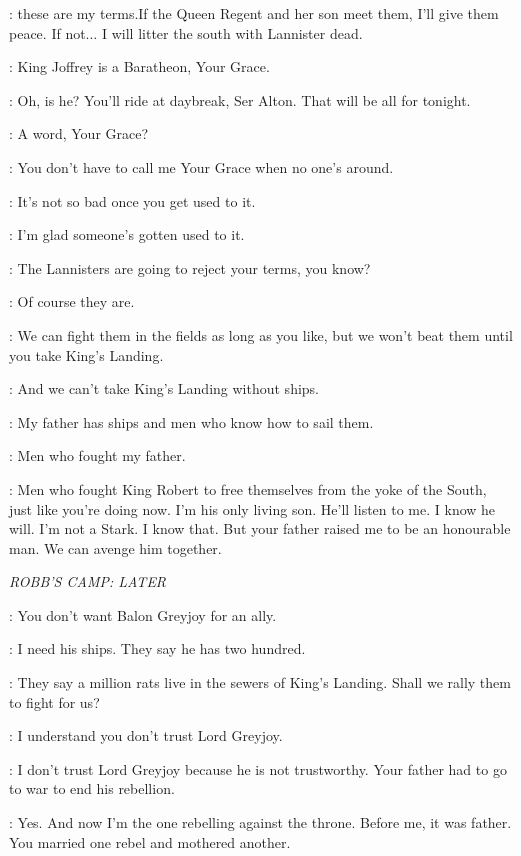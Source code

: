 \ROBB: these are my terms.If the Queen Regent and her son meet them, I'll give them peace. If not$\ldots$ I will litter the south with Lannister dead.

\ALTON: King Joffrey is a Baratheon, Your Grace.

\ROBB: Oh, is he? You'll ride at daybreak, Ser Alton. That will be all for tonight.


\THEON: A word, Your Grace?

\ROBB: You don't have to call me Your Grace when no one's around.

\THEON: It's not so bad once you get used to it.

\ROBB: I'm glad someone's gotten used to it.

\THEON: The Lannisters are going to reject your terms, you know?

\ROBB: Of course they are.

\THEON: We can fight them in the fields as long as you like, but we won't beat them until you take King's Landing.

\ROBB: And we can't take King's Landing without ships.

\THEON: My father has ships and men who know how to sail them.

\ROBB: Men who fought my father.

\THEON: Men who fought King Robert to free themselves from the yoke of the South, just like you're doing now. I'm his only living son. He'll listen to me. I know he will. I'm not a Stark. I know that. But your father raised me to be an honourable man. We can avenge him together.


\scene

\textit{ROBB'S CAMP: LATER}


\CATELYN: You don't want Balon Greyjoy for an ally.

\ROBB: I need his ships. They say he has two hundred.

\CATELYN: They say a million rats live in the sewers of King's Landing. Shall we rally them to fight for us?

\ROBB: I understand you don't trust Lord Greyjoy.

\CATELYN: I don't trust Lord Greyjoy because he is not trustworthy. Your father had to go to war to end his rebellion.

\ROBB: Yes. And now I'm the one rebelling against the throne. Before me, it was father. You married one rebel and mothered another.

